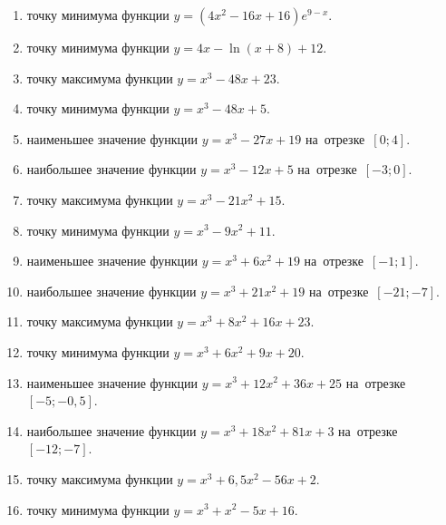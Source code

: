 \documentclass[a4paper,10pt]{article}
\begin{document}
\begin{enumerate}
\item {} точку минимума функции $y=\left(4x^2-16x+16\right){{e}^{9-x}}$.

\item {} точку минимума функции $y=4x-\ln \left(x+8\right)+12$.

\item {} точку максимума функции $y=x^3 -48x +23$.

\item {} точку минимума функции $y=x^3 -48x+5$.

\item {} наименьшее значение функции $y=x^3 -27x+19$ на~отрезке~$\left[0;4\right]$.

\item {} наибольшее значение функции $y=x^3 -12x+5$ на~отрезке~$\left[-3;0\right]$.

\item {} точку максимума функции $y=x^3 -21x^2+15$.

\item {} точку минимума функции $y=x^3 -9x^2+11$.

\item {} наименьшее значение функции $y=x^3 +6x^2+19$ на~отрезке~$\left[-1;1\right]$.

\item {} наибольшее значение функции $y=x^3 +21x^2+19$ на~отрезке~$\left[-21;-7\right]$.

\item {} точку максимума функции $y=x^3 +8x^2+16x+23$.

\item {} точку минимума функции $y=x^3 +6x^2+9x+20$.

\item {} наименьшее значение функции $y=x^3 +12x^2+36x+25$ на~отрезке~$\left[-5;-0,5\right]$.

\item {} наибольшее значение функции $y=x^3 +18x^2+81x+3$ на~отрезке~$\left[-12;-7\right]$.

\item {} точку максимума функции $y=x^3 +6,5x^2-56x+2$.

\item {} точку минимума функции $y=x^3 +x^2-5x+16$.


\end{enumerate}
\end{document}
